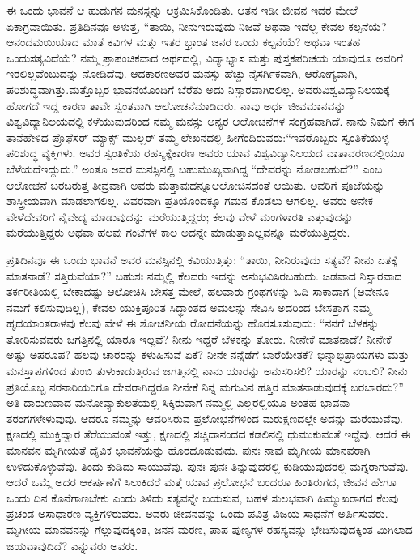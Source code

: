 ಈ ಒಂದು ಭಾವನೆ ಆ ಹುಡುಗನ ಮನಸ್ಸನ್ನು ಆಕ್ರಮಿಸಿಕೊಂಡಿತು. ಆತನ ಇಡೀ ಜೀವನ ಇದರ ಮೇಲೆ ಏಕಾಗ್ರವಾಯಿತು. ಪ್ರತಿದಿನವೂ ಅಳುತ್ತ, “ತಾಯಿ, ನೀನು\break ಇರುವುದು ನಿಜವೆ ಅಥವಾ ಇದೆಲ್ಲ ಕೇವಲ ಕಲ್ಪನೆಯೆ? ಆನಂದಮಯಿಯಾದ ಮಾತೆ ಕವಿಗಳ ಮತ್ತು ಇತರ ಭ್ರಾಂತ ಜನರ ಒಂದು ಕಲ್ಪನೆಯೆ? ಅಥವಾ ಇಂತಹ ಒಂದು\break ಸತ್ಯವಿದೆಯೆ? ನಮ್ಮ ಪ್ರಾಪಂಚಿಕವಾದ ಅರ್ಥದಲ್ಲಿ, ವಿದ್ಯಾಭ್ಯಾಸ ಮತ್ತು ಪುಸ್ತಕ\break ಪರಿಚಯ ಯಾವುದೂ ಅವರಿಗೆ ಇರಲಿಲ್ಲವೆಂಬುದನ್ನು ನೋಡಿದೆವು. ಆದಕಾರಣ\break ಅವರ ಮನಸ್ಸು ಹೆಚ್ಚು ನೈಸರ್ಗಿಕವಾಗಿ, ಆರೋಗ್ಯವಾಗಿ, ಪರಿಶುದ್ಧವಾಗಿತ್ತು.\break ಮತ್ತೊಬ್ಬರ ಭಾವನೆಯೊಂದಿಗೆ ಬೆರೆತು ಅದು ನಿಸ್ಸಾರವಾಗಿರಲಿಲ್ಲ. ಅವರು\break ವಿಶ್ವವಿದ್ಯಾನಿಲಯಕ್ಕೆ ಹೋಗದೆ ಇದ್ದ ಕಾರಣ ತಾವೇ ಸ್ವಂತವಾಗಿ ಆಲೋಚನೆ\break ಮಾಡಿದರು. ನಾವು ಅರ್ಧ ಜೀವಮಾನವನ್ನು ವಿಶ್ವವಿದ್ಯಾನಿಲಯದಲ್ಲಿ ಕಳೆಯುವುದ\-ರಿಂದ ನಮ್ಮ ಮನಸ್ಸು ಅನ್ಯರ ಆಲೋಚನೆಗಳ ಸಂಗ್ರಹವಾಗಿದೆ. ನಾನು ನಿಮಗೆ ಈಗ ತಾನೆ\break ಹೇಳಿದ ಪ್ರೊಫೆಸರ್​ ಮ್ಯಾಕ್ಸ್ ಮುಲ್ಲರ್​ ತಮ್ಮ ಲೇಖನದಲ್ಲಿ ಹೀಗೆಂದಿರುವರು:\break “ಇವರೊಬ್ಬರು ಸ್ವಂತಿಕೆಯುಳ್ಳ ಪರಿಶುದ್ಧ ವ್ಯಕ್ತಿಗಳು. ಅವರ ಸ್ವಂತಿಕೆಯ ರಹಸ್ಯಕ್ಕೆ\break ಕಾರಣ ಅವರು ಯಾವ ವಿಶ್ವವಿದ್ಯಾನಿಲಯದ ವಾತಾವರಣದಲ್ಲಿಯೂ ಬೆಳೆಯದೆ\break ಇದ್ದುದು.” ಅಂತೂ ಅವರ ಮನಸ್ಸಿನಲ್ಲಿ ಬಹುಮುಖ್ಯವಾಗಿದ್ದ “ದೇವರನ್ನು ನೋಡಬಹುದೆ?” ಎಂಬ ಆಲೋಚನೆ ಬರಬರುತ್ತ ತೀವ್ರವಾಗಿ ಅವರು ಮತ್ತಾವುದನ್ನೂ\break ಆಲೋಚಿಸದಂತೆ ಆಯಿತು. ಅವರಿಗೆ ಪೂಜೆಯನ್ನು ಶಾಸ್ತ್ರೀಯವಾಗಿ ಮಾಡಲಾಗಲಿಲ್ಲ. ವಿವರವಾಗಿ ಪ್ರತಿಯೊಂದಕ್ಕೂ ಗಮನ ಕೊಡಲು ಆಗಲಿಲ್ಲ. ಅವರು ಅನೇಕ ವೇಳೆ\break ದೇವರಿಗೆ ನೈವೇದ್ಯ ಮಾಡುವುದನ್ನು ಮರೆಯುತ್ತಿದ್ದರು; ಕೆಲವು ವೇಳೆ ಮಂಗಳಾರತಿ ಎತ್ತುವುದನ್ನು ಮರೆಯುತ್ತಿದ್ದರು ಅಥವಾ ಹಲವು ಗಂಟೆಗಳ ಕಾಲ ಅದನ್ನೇ ಮಾಡುತ್ತಾ\break ಎಲ್ಲವನ್ನೂ ಮರೆಯುತ್ತಿದ್ದರು.

ಪ್ರತಿದಿನವೂ ಈ ಒಂದು ಭಾವನೆ ಅವರ ಮನಸ್ಸಿನಲ್ಲಿ ಕವಿಯುತ್ತಿತ್ತು: “ತಾಯಿ, ನೀನಿರುವುದು ಸತ್ಯವೆ? ನೀನು ಏತಕ್ಕೆ ಮಾತನಾಡೆ? ಸತ್ತಿರುವೆಯಾ?” ಬಹುಶಃ ನಮ್ಮಲ್ಲಿ ಕೆಲವರು ಇದನ್ನು ಅನುಭವಿಸಿರಬಹುದು. ಜಡವಾದ ನಿಸ್ಸಾರವಾದ ತರ್ಕರೀತಿಯಲ್ಲಿ ಬೇಕಾದಷ್ಟು ಆಲೋಚಿಸಿ ಬೇಸತ್ತ ಮೇಲೆ, ಹಲವಾರು ಗ್ರಂಥಗಳನ್ನು ಓದಿ ಸಾಕಾದಾಗ (ಅವೇನೂ ನಮಗೆ ಕಲಿಸುವುದಿಲ್ಲ), ಕೇವಲ ಯುಕ್ತಿಪೂರಿತ ಸಿದ್ಧಾಂತದ ಅಮಲನ್ನು ಸೇವಿಸಿ ಅದರಿಂದ ಬೇಸತ್ತಾಗ ನಮ್ಮ ಹೃದಯಾಂತರಾಳವು ಕೆಲವು ವೇಳೆ ಈ ಶೋಚನೀಯ ರೋದನೆಯನ್ನು ಹೊರಸೂಸುವುದು: “ನನಗೆ ಬೆಳಕನ್ನು ತೋರಿಸುವವರು ಜಗತ್ತಿನಲ್ಲಿ ಯಾರೂ ಇಲ್ಲವೆ? ನೀನು ಇದ್ದರೆ ಬೆಳಕನ್ನು ತೋರು. ನೀನೇಕೆ ಮಾತನಾಡೆ? ನೀನೇಕೆ ಅಷ್ಟು ಅಪರೂಪ? ಹಲವು ಚಾರರನ್ನು ಕಳುಹಿಸುವೆ ಏಕೆ? ನೀನೇ ನನ್ನೆಡೆಗೆ ಬಾರೆಯೇತಕೆ? ಭಿನ್ನಾಭಿಪ್ರಾಯಗಳು ಮತ್ತು ಮನಸ್ತಾಪಗಳಿಂದ ತುಂಬಿ ತುಳುಕಾಡುತ್ತಿರುವ ಜಗತ್ತಿನಲ್ಲಿ ನಾನು ಯಾರನ್ನು ಅನುಸರಿಸಲಿ? ಯಾರನ್ನು ನಂಬಲಿ? ನೀನು ಪ್ರತಿಯೊಬ್ಬ ನರನಾರಿಯರಿಗೂ ದೇವರಾಗಿದ್ದರೂ ನೀನೇಕೆ ನಿನ್ನ ಮಗುವಿನ ಹತ್ತಿರ ಮಾತನಾಡುವುದಕ್ಕೆ ಬರಬಾರದು?” ಅತಿ ದಾರುಣವಾದ ಮನೋವ್ಯಾಕುಲತೆಯಲ್ಲಿ ಸಿಕ್ಕಿರುವಾಗ ನಮ್ಮಲ್ಲಿ ಎಲ್ಲರಲ್ಲಿಯೂ ಅಂತಹ ಭಾವನಾ ತರಂಗಗಳೇಳುವುವು. ಆದರೂ ನಮ್ಮನ್ನು ಆವರಿಸಿರುವ ಪ್ರಲೋಭನೆಗಳಿಂದ ಮರುಕ್ಷಣದಲ್ಲೇ ಅದನ್ನು ಮರೆಯುವೆವು. ಕ್ಷಣದಲ್ಲಿ ಮುಕ್ತಿದ್ವಾರ ತೆರೆಯುವಂತೆ ಇತ್ತು, ಕ್ಷಣದಲ್ಲಿ ಸಚ್ಚಿದಾನಂದದ ಕಡಲಿನಲ್ಲಿ ಧುಮುಕುವಂತೆ ಇದ್ದೆವು. ಆದರೆ ಈ ಮಾನವನ ಮೃಗೀಯತೆ ದೈವಿಕ ಭಾವನೆಯನ್ನು ಹೊರದೂಡುವುದು. ಪುನಃ ನಾವು ಮೃಗೀಯ ಮಾನವರಾಗಿ ಉಳಿದುಕೊಳ್ಳುವೆವು. ತಿಂದು ಕುಡಿದು ಸಾಯುವೆವು. ಪುನಃ ಪುನಃ ತಿನ್ನುವುದರಲ್ಲಿ ಕುಡಿಯುವುದರಲ್ಲಿ ಮಗ್ನರಾಗುವೆವು. ಆದರೆ ಒಮ್ಮೆ ಅದರ ಆಕರ್ಷಣೆಗೆ ಸಿಲುಕಿದರೆ ಮತ್ತೆ ಯಾವ ಪ್ರಲೋಭನೆ ಬಂದರೂ ಹಿಂತಿರುಗದ, ಜೀವನ ಹೇಗೂ ಒಂದು ದಿನ ಕೊನೆಗಾಣಬೇಕು ಎಂದು ತಿಳಿದು ಸತ್ಯವನ್ನೇ ಬಯಸುವ, ಬಹಳ ಸುಲಭವಾಗಿ ಹಿಮ್ಮುಖರಾಗದ ಕೆಲವು ಪ್ರಚಂಡ ಅಸಾಧಾರಣ ವ್ಯಕ್ತಿಗಳಿರುವರು. ಅವರು ಜೀವನವನ್ನು ಒಂದು ಪವಿತ್ರ ವಿಜಯ ಸಾಧನೆಗೆ ಅರ್ಪಿಸುವರು. ಮೃಗೀಯ ಮಾನವನನ್ನು ಗೆಲ್ಲುವುದಕ್ಕಿಂತ, ಜನನ ಮರಣ, ಪಾಪ ಪುಣ್ಯಗಳ ರಹಸ್ಯವನ್ನು ಭೇದಿಸುವುದಕ್ಕಿಂತ ಮಿಗಿಲಾದ ಜಯವಾವುದಿದೆ? ಎನ್ನುವರು ಅವರು.

